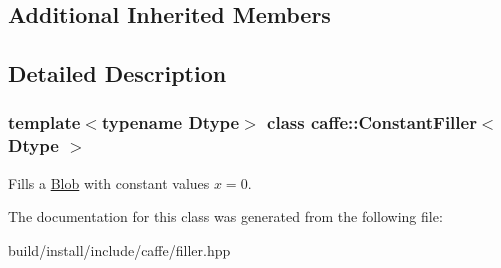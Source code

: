 \subsection*{Additional Inherited Members}


\subsection{Detailed Description}
\subsubsection*{template$<$typename Dtype$>$\newline
class caffe\+::\+Constant\+Filler$<$ Dtype $>$}

Fills a \mbox{\hyperlink{classcaffe_1_1_blob}{Blob}} with constant values $ x = 0 $. 

The documentation for this class was generated from the following file\+:\begin{DoxyCompactItemize}
\item 
build/install/include/caffe/filler.\+hpp\end{DoxyCompactItemize}
